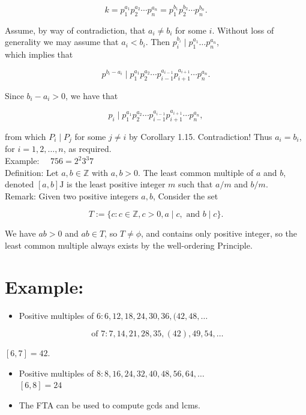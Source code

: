 \documentclass[10pt]{article}
\begin{document}
$$
k=p_{1}^{a_{1}} p_{2}^{a_{2}} \cdots p_{n}^{a_{n}}=p_{1}^{b_{1}} p_{2}^{b_{2}} \cdots p_{n}^{b_{n}} .
$$

Assume, by way of contradiction, that $a_{i} \neq b_{i}$ for some $i$. Without loss of\\
generality we may assume that $a_{i}<b_{i}$. Then $p_{i}^{b_{i}} \mid p_{1}^{a_{1}} \ldots p_{n}^{a_{n}}$,\\
which implies that

$$
p^{b_{i}-a_{i}} \mid p_{1}^{a_{1}} p_{2}^{a_{2}} \cdots p_{i-1}^{a_{i-1}} p_{i+1}^{a_{i+1}} \cdots p_{n}^{a_{n}} .
$$

Since $b_{i}-a_{i}>0$, we have that

$$
p_{i} \mid p_{1}^{a_{1}} p_{2}^{a_{2}} \cdots p_{i-1}^{a_{i-1}} p_{i+1}^{a_{i+1}} \cdots p_{n}^{a_{n}},
$$

from which $P_{i} \mid P_{j}$ for some $j \neq i$ by Corollary 1.15. Contradiction! Thus $a_{i}=b_{i}$, for $i=1,2, \ldots, n$, as required.\\
Example: $\quad 756=2^{2} 3^{3} 7$\\
Definition: Let $a, b \in \mathbb{Z}$ with $a, b>0$. The least common multiple of $a$ and $b$, denoted $[a, b] \mathrm{J}$ is the least positive integer $m$ such that $a / m$ and $b / m$.\\
Remark: Given two positive integers $a, b$, Consider the set

$$
T:=\{c: c \in \mathbb{Z}, c>0, a \mid c, \text { and } b \mid c\} .
$$

We have $a b>0$ and $a b \in T$, so $T \neq \phi$, and contains only positive integer, so the least common multiple always exists by the well-ordering Principle.

\section*{Example:}
\begin{itemize}
  \item Positive multiples of $6: 6,12,18,24,30,36,(42,48, \ldots$
\end{itemize}

$$
\text { of } 7: 7,14,21,28,35,(42), 49,54, \ldots
$$

$[6,7]=42$.

\begin{itemize}
  \item Positive multiples of $8: 8,16,24,32,40,48,56,64, \ldots$\\
$[6,8]=24$
  \item The FTA can be used to compute gcds and lcms.
\end{itemize}
\end{document}
